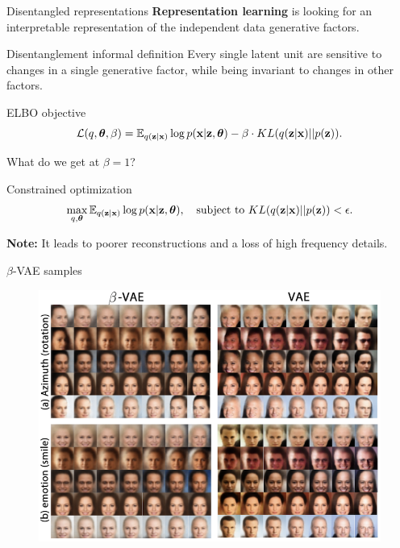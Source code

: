 \documentclass{beamer}
\begin{document}
\begin{frame}{Disentangled representations}
	\vspace{-0.2cm}
	\textbf{Representation learning} is looking for an interpretable representation of the independent data generative factors. 
	\begin{block}{Disentanglement informal definition}
		Every single latent unit are sensitive to changes in a single generative factor, while being invariant to changes in other factors. 
	\end{block}
	\vspace{-0.2cm}
	\begin{block}{ELBO objective}
		\vspace{-0.2cm}
		\[
		\mathcal{L}(q, \boldsymbol{\theta}, \beta) = \mathbb{E}_{q(\mathbf{z} | \mathbf{x})} \log p(\mathbf{x} | \mathbf{z}, \boldsymbol{\theta}) - \beta \cdot KL (q(\mathbf{z} | \mathbf{x}) || p(\mathbf{z})).
		\]
		\vspace{-0.5cm}
	\end{block}
	What do we get at $\beta = 1$? \\
	\begin{block}{Constrained optimization}
		\vspace{-0.7cm}
		\[
		\max_{q, \boldsymbol{\theta}} \mathbb{E}_{q(\mathbf{z} | \mathbf{x})} \log p(\mathbf{x} | \mathbf{z}, \boldsymbol{\theta}), \quad \text{subject to } KL (q(\mathbf{z} | \mathbf{x}) || p(\mathbf{z})) < \epsilon.
		\]
		\vspace{-0.7cm}
	\end{block}
	\textbf{Note:} It leads to poorer reconstructions and a loss of high frequency details. 
\end{frame}
\begin{frame}{$\beta$-VAE samples}
	\begin{figure}
		\centering
		\includegraphics[width=0.9\linewidth]{figs/betaVAE_1.png}
	\end{figure}
	
\end{frame}
\end{document}

